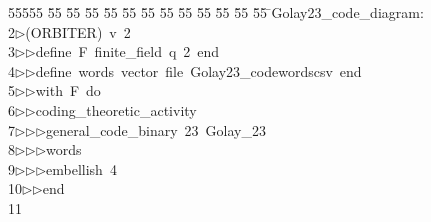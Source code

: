 %
%
\begin{tabbing}
55555 \= 55 \= 55 \= 55 \= 55 \= 55 \= 55 \= 55 \= 55 \= 55 \= 55 \= 55 \= 55 \= \>Golay23\_code\_diagram:\\[0pt]
2\>$\triangleright$\>(ORBITER)\ v\ 2\ \\[0pt]
3\>$\triangleright$\>$\triangleright$\>define\ F\ finite\_field\ q\ 2\ end\ \\[0pt]
4\>$\triangleright$\>$\triangleright$\>define\ words\ vector\ file\ Golay23\_codewordscsv\ end\ \\[0pt]
5\>$\triangleright$\>$\triangleright$\>with\ F\ do\ \\[0pt]
6\>$\triangleright$\>$\triangleright$\>coding\_theoretic\_activity\ \\[0pt]
7\>$\triangleright$\>$\triangleright$\>$\triangleright$\>general\_code\_binary\ 23\ Golay\_23\ \\[0pt]
8\>$\triangleright$\>$\triangleright$\>$\triangleright$\>words\ \\[0pt]
9\>$\triangleright$\>$\triangleright$\>$\triangleright$\>embellish\ 4\ \\[0pt]
10\>$\triangleright$\>$\triangleright$\>end\\[0pt]
11\>\end{tabbing}

